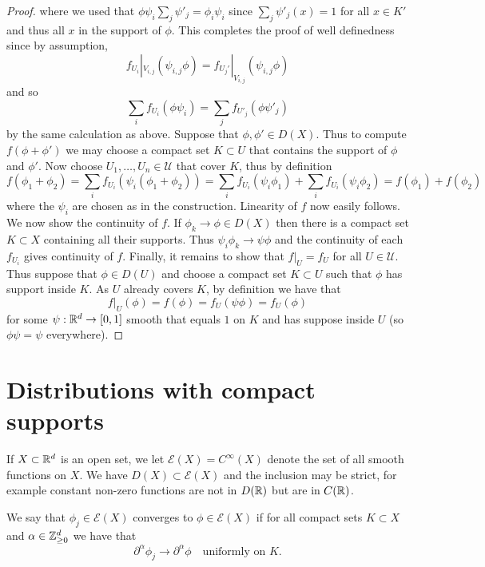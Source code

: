 \documentclass[twoside, a4paper, 10pt]{amsart}
\begin{document}
\begin{proof}
where we used that $\phi \psi_i \sum_j \psi'_j = \phi_i\psi_i$ since $\sum_j \psi'_j(x) = 1$ for all $x \in K'$ and thus all $x$ in the support of $\phi$. This completes the proof of well definedness since by assumption, $$f_{U_i}|_{V_{i,j}}(\psi_{i,j}\phi) = f_{U_j'}|_{V_{i,j}}(\psi_{i,j}\phi)$$ and so  $$\sum_i f_{U_i}(\phi \psi_i) = \sum_j f_{U'_j}(\phi \psi'_j)$$ by the same calculation as above. Suppose that $\phi, \phi' \in D(X)$. Thus to compute $f(\phi + \phi')$ we may choose a compact set $K \subset U$ that contains the support of $\phi$ and $\phi'$. Now choose $U_1, \ldots, U_n \in \mathcal{U}$ that cover $K$, thus by definition $$f(\phi_1 + \phi_2) = \sum_{i} f_{U_i} (\psi_i (\phi_1 + \phi_2)) = \sum_i f_{U_i}(\psi_i \phi_1) + \sum_i f_{U_i}(\psi_i \phi_2) = f(\phi_1) + f(\phi_2)$$ where the $\psi_i$ are chosen as in the construction. Linearity of $f$ now easily follows. We now show the continuity of $f$. If $\phi_k \to \phi \in D(X)$ then there is a compact set $K \subset X$ containing all their supports. Thus $\psi_i \phi_k \to \psi \phi$ and the continuity of each $f_{U_i}$ gives continuity of $f$. Finally, it remains to show that $f|_{U} = f_{U}$ for all $U \in \mathcal{U}$. Thus suppose that $\phi \in D(U)$ and choose a compact set $K \subset U$ such that $\phi$ has support inside $K$. As $U$ already covers $K$, by definition we have that $$f|_U(\phi) = f(\phi) =  f_U(\psi \phi) = f_U(\phi)$$ for some $\psi:\mathbb{R}^d \to [0,1]$ smooth that equals $1$ on $K$ and has suppose inside $U$ (so $\phi\psi = \psi$ everywhere). \end{proof}

\section{Distributions with compact supports}

If $X \subset \mathbb{R}^d$ is an open set, we let $\mathcal{E}(X) = C^{\infty}(X)$ denote the set of all smooth functions on $X$. We have $D(X) \subset \mathcal{E}(X)$ and the inclusion may be strict, for example constant non-zero functions are not in $D(\mathbb{R})$ but are in $C(\mathbb{R})$.

\begin{mydef} We say that $\phi_j \in \mathcal{E}(X)$ converges to $\phi \in \mathcal{E}(X)$ if for all compact sets $K \subset X$ and $\alpha \in \mathbb{Z}_{\geq 0}^d$ we have that $$\partial^{\alpha}\phi_j \to \partial^{\alpha}\phi \quad \text{uniformly on } K. $$

\end{mydef}
\end{document}
